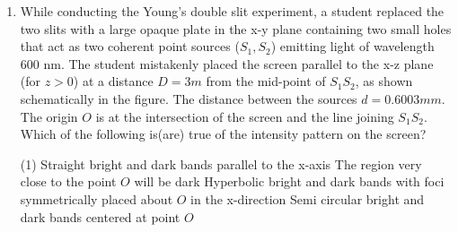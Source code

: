 
\begin{enumerate}
    \item While conducting the Young's double slit experiment, a student replaced the two slits with a large opaque plate in the x-y plane containing two small holes that act as two coherent point sources (\(S_1, S_2\)) emitting light of wavelength 600 nm. The student mistakenly placed the screen parallel to the x-z plane (for \(z > 0\)) at a distance \(D = 3 m\) from the mid-point of \(S_1S_2\), as shown schematically in the figure. The distance between the sources \(d = 0.6003 mm\). The origin \(O\) is at the intersection of the screen and the line joining \(S_1S_2\). Which of the following is(are) true of the intensity pattern on the screen?
        \begin{tasks}(1)
            \task Straight bright and dark bands parallel to the x-axis
            \task The region very close to the point \(O\) will be dark
            \task Hyperbolic bright and dark bands with foci symmetrically placed about \(O\) in the x-direction
            \task Semi circular bright and dark bands centered at point \(O\)
        \end{tasks}
\end{enumerate}
\begin{center}
\end{center}
